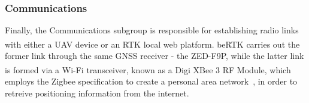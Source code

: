 \subsubsection{Communications}\label{sec:II_architecture_Communications}

Finally, the Communications subgroup is responsible for establishing radio links with either a UAV device or an RTK local web platform. beRTK\textsuperscript{\textregistered} carries out the former link through the same GNSS receiver - the ZED-F9P, while the latter link is formed via a Wi-Fi transceiver, known as a Digi XBee\textsuperscript{\textregistered} 3 RF Module, which employs the Zigbee specification to create a personal area network~\cite{XBee}, in order to retreive positioning information from the internet.


